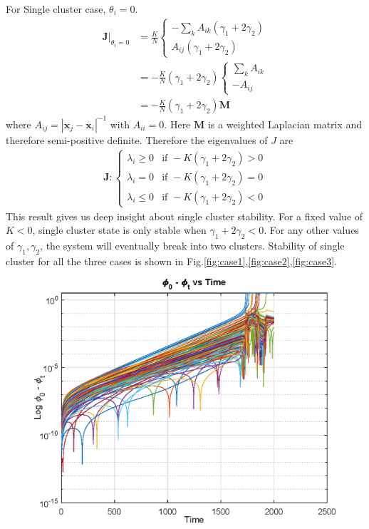\documentclass[twocolumn,10pt]{asme2ej}
\begin{document}
{{        For Single cluster case, \(\theta_i = 0\). 
        \begin{align}
            \left.\mathbf{J}\right|_{\theta_i = 0} &= \frac{K}{N}\begin{cases}
                -\sum_{k} A_{ik} (\gamma_1 + 2\gamma_2) \nonumber \\
                A_{ij}(\gamma_1 + 2\gamma_2)
            \end{cases}\\
            &= -\frac{K}{N}(\gamma_1 + 2\gamma_2) \begin{cases}
                \sum_{k} A_{ik} \nonumber\\
                -A_{ij}
            \end{cases}\\
            &= -\frac{K}{N}(\gamma_1 + 2\gamma_2) \mathbf{M}
        \end{align}
        where \(A_{ij} = |\mathbf{x}_j - \mathbf{x}_i|^{-1}\) with \(A_{ii} = 0\). Here \(\mathbf{M}\) is a weighted Laplacian matrix and therefore semi-positive definite. Therefore the eigenvalues of \(J\) are 
        \begin{align}
            \mathbf{J} : \begin{cases}
                \lambda_i \geq 0 & \text{if } -K(\gamma_1 + 2\gamma_2) > 0 \\
                \lambda_i = 0 & \text{if } -K(\gamma_1 + 2\gamma_2) = 0 \\
                \lambda_i \leq 0 & \text{if } -K(\gamma_1 + 2\gamma_2) < 0 
            \end{cases}
        \end{align} 
        This result gives us deep insight about single cluster stability. For a fixed value of \(K < 0\), single cluster state is only stable when \(\gamma_1 + 2\gamma_2 < 0\). For any other values of \(\gamma_1,\gamma_2\), the system will eventually break into two clusters. Stability of single cluster for all the three cases is shown in Fig.\ref{fig:case1},\ref{fig:case2},\ref{fig:case3}.
        \begin{figure}[h!]
            \includegraphics[width = \linewidth]{unstablePositive.eps}

\end{figure}}}
\end{document}
